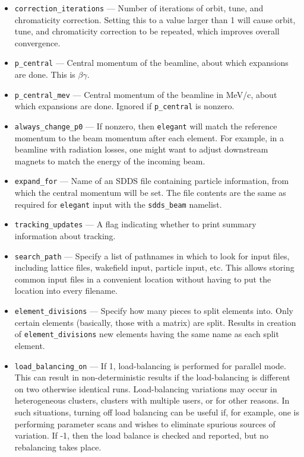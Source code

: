 \documentclass[11pt]{article}
\begin{document}
\begin{itemize}
\item \verb|correction_iterations| --- Number of iterations of orbit, tune, and chromaticity correction.
  Setting this to a value larger than 1 will cause orbit, tune, and chromaticity correction to be repeated, which improves
  overall convergence.
\item \verb|p_central| --- Central momentum of the beamline, about which expansions are done.
        This is $\beta\gamma$.
\item \verb|p_central_mev| --- Central momentum of the beamline in
MeV/c, about which expansions are done.  Ignored if \verb|p_central| is nonzero.
\item \verb|always_change_p0| --- If nonzero, then {\tt elegant} will match the reference momentum to
  the beam momentum after each element.  For example, in a beamline with radiation losses, one might
  want to adjust downstream magnets to match the energy of the incoming beam.
\item \verb|expand_for| --- Name of an SDDS file containing particle information, from which the central
momentum will be set.  The file contents are the same as required for {\tt elegant} input with the \verb|sdds_beam| namelist.
\item \verb|tracking_updates| --- A flag indicating whether to print summary information about
tracking.
\item \verb|search_path| --- Specify a list of pathnames in which to look for input files,
 including lattice files, wakefield input, particle input, etc.  This allows storing common
 input files in a convenient location without having to put the location into every filename.
\item \verb|element_divisions| --- Specify how many pieces to split elements into.  Only 
 certain elements (basically, those with a matrix) are split.  Results in creation of 
 \verb|element_divisions| new elements having the same name as each split element.
\item \verb|load_balancing_on| --- If 1, load-balancing is performed for parallel mode.
 This can result in non-deterministic results if the load-balancing is different on two
 otherwise identical runs.  Load-balancing variations may occur in heterogeneous clusters,
 clusters with multiple users, or for other reasons.  In such situations, turning off 
 load balancing can be useful if, for example, one is performing parameter scans and
 wishes to eliminate spurious sources of variation.
 If -1, then the load balance is checked and reported, but no rebalancing takes place.

\end{itemize}
\end{document}
